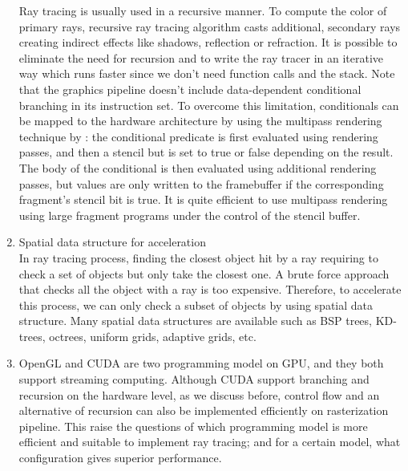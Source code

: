 \begin{enumerate}
    Ray tracing is usually used in a recursive manner. To compute the color of primary rays, recursive ray tracing algorithm casts additional, secondary rays creating indirect effects like shadows, reflection or refraction. It is possible to eliminate the need for recursion and to write the ray tracer in an iterative way which runs faster since we don't need function calls and the stack. Note that the graphics pipeline doesn't include data-dependent conditional branching in its instruction set. To overcome this limitation, conditionals can be mapped to the hardware architecture by using the multipass rendering technique by \cite{peercy2000interactive}: the conditional predicate is first evaluated using rendering passes, and then a stencil but is set to true or false depending on the result. The body of the conditional is then evaluated using additional rendering passes, but values are only written to the framebuffer if the corresponding fragment's stencil bit is true. It is quite efficient to use multipass rendering using large fragment programs under the control of the stencil buffer.
    \item Spatial data structure for acceleration\\
    In ray tracing process, finding the closest object hit by a ray requiring to check a set of objects but only take the closest one. A brute force approach that checks all the object with a ray is too expensive. Therefore, to accelerate this process, we can only check a subset of objects by using spatial data structure. Many spatial data structures are available such as BSP trees, KD-trees, octrees, uniform grids, adaptive grids, etc. 
    \item OpenGL and CUDA are two programming model on GPU, and they both support streaming computing. Although CUDA support branching and recursion on the hardware level, as we discuss before, control flow and an alternative of recursion can also be implemented efficiently on rasterization pipeline. This raise the questions of which programming model is more efficient and suitable to implement ray tracing; and for a certain model, what configuration gives superior performance.      
    
\end{enumerate}

